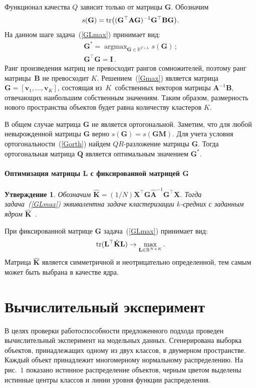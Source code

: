 \documentclass[12pt,twoside]{article}
\newtheorem{Th}{Утверждение}
\begin{document}
Функционал качества $Q$ зависит только от матрицы $\mathbf{G}$. Обозначим
\[
    s(\mathbf{G}) = \Tr \bigl((\mathbf{G}^{\top} \mathbf{A G})^{-1} \mathbf{G}^{\top} \mathbf{B G}\bigr).
\]
На данном шаге задача~(\ref{GLmax}) принимает вид:
\begin{gather}
    \label{Gmax}
    \mathbf{G}^* = \mathop{\arg \max}_{\mathbf{G} \in \mathbb{R}^{T \times L}} s(\mathbf{G})\,; \\
    \label{Gorth}
    \mathbf{G}^{\top} \mathbf{G} = \mathbf{I}\,.
\end{gather}
Ранг произведения матриц не превосходит рангов сомножителей, поэтому ранг матрицы~$\mathbf{B}$ не превосходит $K$.
Решением~(\ref{Gmax}) является матрица $\mathbf{G} = [\mathbf{v}_1, \ldots, \mathbf{v}_K]$, состоящая
из~$K$~собственных векторов матрицы $\mathbf{A}^{-1}\mathbf{B}$, отвечающих наибольшим собственным значениям.
Таким образом, размерность нового пространства объектов будет равна количеству кластеров $K$.

В общем случае матрица $\mathbf{G}$ не является ортогональной.
Заметим, что для любой невырожденной матрицы $\mathbf{G}$ верно $s(\mathbf{G}) = s(\mathbf{G M})$.
Для учета условия ортогональности~(\ref{Gorth}) найдем $QR$-разложение матрицы $\mathbf{G}$.
Тогда ортогональная матрица $\mathbf{Q}$ является оптимальным значением $\mathbf{G}^*$.

\paragraph{Оптимизация матрицы L с фиксированной матрицей G}
\begin{Th}
 Обозначим $\hat{\mathbf{K}} = (1/N)\mathbf{X}^{\top} \mathbf{G} \hat{\mathbf{A}}^{-1} \mathbf{G}^{\top} \mathbf{X}$.
 Тогда задача~(\ref{GLmax}) эквивалентна задаче кластеризации $k$-средних с заданным ядром $\hat{\mathbf{K}}$~\cite{shawe2004kernel}.
\end{Th}

При фиксированной матрице $\mathbf{G}$ задача~(\ref{GLmax}) принимает вид:
\begin{equation*}
    \Tr (\mathbf{L}^{\top} \hat{\mathbf{K}} \mathbf{L}) \to \max_{\mathbf{L} \in \mathbb{R}^{N \times K}}.
\end{equation*}
Матрица $\hat{\mathbf{K}}$ является симметричной и неотрицательно определенной, тем самым может быть выбрана в качестве ядра.


\section{Вычислительный эксперимент}
В целях проверки работоспособности предложенного подхода проведен вычислительный эксперимент на модельных данных. Сгенерирована выборка объектов, принадлежащих одному из двух классов, в двумерном пространстве.
Каждый объект принадлежит многомерному нормальному распределению.
На рис.~$1$ показано истинное распределение объектов, черным цветом выделены истинные центры классов и линии уровня функции распределения.
\end{document}
